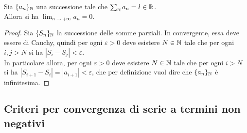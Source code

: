 \documentclass{article}
\begin{document}
\begin{theorem}{}{}
    Sia $\{a_n\}_{\mathbb{N}}$ una successione tale che $\sum_{\mathbb{N}} a_n = l \in \mathbb{R}$.\\
    Allora si ha $\lim_{n\to+\infty} a_n = 0$.
\end{theorem}
\begin{proof}
    Sia $\{S_n\}_{\mathbb{N}}$ la successione delle somme parziali. In convergente, essa deve essere di Cauchy, quindi per ogni $\varepsilon>0$ deve esistere $N \in \mathbb{N}$ tale che per ogni $i, j > N$ si ha $|S_i - S_j|<\varepsilon$.\\
    In particolare allora, per ogni $\varepsilon>0$ deve esistere $N\in \mathbb{N}$ tale che per ogni $i>N$ si ha $|S_{i+1}-S_i| = |a_{i+1}| < \varepsilon$, che per definizione vuol dire che $\{a_n\}_{\mathbb{N}}$ è infinitesima.
\end{proof}

\subsection{Criteri per convergenza di serie a termini non negativi}
\end{document}
